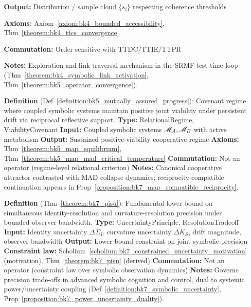 \begin{description}[leftmargin=2.5cm, style=nextline]
\textbf{Output:} Distribution / sample cloud \( \{s_i\} \) respecting coherence thresholds

\textbf{Axioms:} Axiom~\ref{axiom:bk4_bounded_accessibility}, Thm~\ref{theorem:bk4_ttcs_convergence}

\textbf{Commutation:} Order-sensitive with TTDC/TTIE/TTPR

\textbf{Notes:} Exploration and link-traversal mechanism in the SRMF test-time
loop (Thm~\ref{theorem:bk4_symbolic_link_activation},
Thm~\ref{theorem:bk5_operator_convergence}).

\item[\textbf{Mutually Assured Progress} \hfill \ensuremath{\mathrm{MAP}}] 
\label{dict:appA_mutually_assured_progress}
\textbf{Definition} (Def~\ref{definition:bk5_mutually_assured_progress}): Covenant regime where coupled symbolic systems maintain positive joint viability under persistent drift via reciprocal reflective support.
\textbf{Type:} RelationalRegime, ViabilityCovenant
\textbf{Input:} Coupled symbolic systems \( \mathscr{M}_A, \mathscr{M}_B \) with active metabolism
\textbf{Output:} Sustained positive-viability cooperative regime
\textbf{Axioms:} Thm~\ref{theorem:bk5_map_equilibrium}, Thm~\ref{theorem:bk5_map_mad_critical_temperature}
\textbf{Commutation:} Not an operator (regime-level relational criterion)
\textbf{Notes:} Canonical cooperative attractor contrasted with MAD collapse dynamics; reciprocity-compatible continuation appears in Prop~\ref{proposition:bk7_map_compatible_reciprocity}.

\item[\textbf{Universal Symbolic Uncertainty Principle (PISU)} \hfill \ensuremath{\Delta\Sigma_I \cdot \Delta K_S}] 
\label{dict:appA_universal_symbolic_uncertainty_principle}
\textbf{Definition} (Thm~\ref{theorem:bk7_pisu}): Fundamental lower bound on simultaneous identity-resolution and curvature-resolution precision under bounded observer bandwidth.
\textbf{Type:} UncertaintyPrinciple, ResolutionTradeoff
\textbf{Input:} Identity uncertainty \( \Delta\Sigma_I \), curvature uncertainty \( \Delta K_S \), drift magnitude, observer bandwidth
\textbf{Output:} Lower-bound constraint on joint symbolic precision
\textbf{Constraint law:} Scholium~\ref{scholium:bk7_constrained_uncertainty_motivation} (motivation), Thm~\ref{theorem:bk7_pisu} (derived)
\textbf{Commutation:} Not an operator (constraint law over symbolic observation dynamics)
\textbf{Notes:} Governs precision trade-offs in advanced symbolic cognition and control, dual to systemic power/uncertainty coupling (Def~\ref{definition:bk7_symbolic_uncertainty}, Prop~\ref{proposition:bk7_power_uncertainty_duality}).


\end{description}
